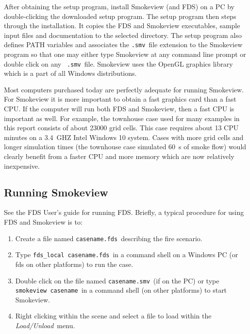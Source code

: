 \documentclass[11pt,twoside]{book}
\begin{document}
After obtaining the setup program, install Smokeview (and FDS)  on a PC by
double-clicking the downloaded
setup program. The setup program then steps through the
installation. It copies the FDS and Smokeview executables,
sample input files and documentation to the selected directory.  The setup program also
defines PATH variables and associates the {\tt .smv}\ file
extension to the Smokeview program so that one may either type
Smokeview at any command line prompt or double click on any {\tt
.smv}\ file. Smokeview uses the OpenGL graphics library which is a
part of all Windows distributions.

Most computers purchased today are perfectly adequate for running
Smokeview. For Smokeview it is more important to obtain a fast
graphics card than a fast CPU. If the computer will run both FDS
and Smokeview, then a fast CPU is important as well.
For example, the townhouse case used for many examples in this
report consists of about 23000 grid cells.  This case requires
about 13 CPU minutes on a 3.4~GHZ Intel Windows 10
system. Cases with more grid cells and longer simulation times
(the townhouse case simulated 60~s of smoke flow) would clearly
benefit from a faster CPU and more memory which are now relatively
inexpensive.


\subsection{Running Smokeview}

See the FDS User's guide for running FDS\cite{FDS_Users_Guide}.  Briefly, a typical procedure for using FDS and Smokeview is to:
\begin{enumerate}

\item Create a file named {\tt casename.fds}\ describing the fire
scenario.

\item Type {\tt fds\_local~casename.fds}\ in a command shell on a Windows PC (or fds on other platforms) to run the
case.

\item Double click on the file named {\tt casename.smv}\ (if on the
PC) or type {\tt smokeview~casename}\ in a command shell (on other
platforms) to start Smokeview.

\item Right clicking within the scene and select a file to load
within the {\em Load/Unload}\ menu.
\end{enumerate}
\end{document}
